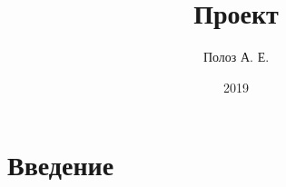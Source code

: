 \documentclass{article}
\title{Проект}
\author{Полоз А. Е.}
\date{2019}
\begin{document}
\maketitle

\section{Введение}
\end{document}
